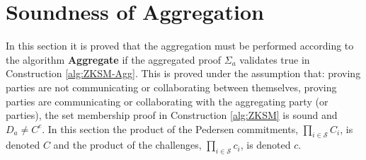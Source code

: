 \section{Soundness of Aggregation}
\label{sec:SecurityAggregation}
In this section it is proved that the aggregation must be performed according to the algorithm \textbf{Aggregate} if the aggregated proof $\Sigma_a$ validates true in Construction \ref{alg:ZKSM-Agg}. This is proved under the assumption that: proving parties are not communicating or collaborating between themselves, proving parties are communicating or collaborating with the aggregating party (or parties), the set membership proof in Construction \ref{alg:ZKSM} is sound and $D_a\neq C^c$.  In this section the product of the Pedersen commitments, $\prod_{i\in\mathcal{S}}C_i$, is denoted $C$ and the product of the challenges, $\prod_{i\in\mathcal{S}} c_i$, is denoted $c$.


